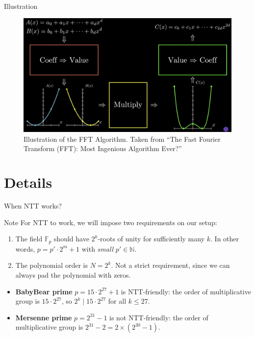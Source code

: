 \documentclass{zkdl-presentation-template}
\begin{document}
    \begin{frame}{Illustration}
        \begin{figure}
            \centering
            \includegraphics[width=\textwidth]{images/lecture_13/ntt_visualization.png}
            \caption{Illustration of the FFT Algorithm. Taken from ``The Fast Fourier Transform (FFT): Most Ingenious Algorithm Ever?''}
        \end{figure}
    \end{frame}

    \section{Details}

    \begin{frame}{When NTT works?}
        \begin{block}{Note}
            For NTT to work, we will impose two requirements on 
            our setup:
            \begin{enumerate}
                \item The field $\mathbb{F}_p$ should have $2^k$-roots of unity for sufficiently many $k$. In other words, $p=p' \cdot 2^m + 1$ with \emph{small} $p' \in \mathbb{N}$.\pause
                \item The polynomial order is $N=2^k$. Not a strict requirement, since we can always pad the polynomial with zeros.\pause
            \end{enumerate}
        \end{block}

        \begin{example}
            \begin{itemize}
                \item \textbf{BabyBear prime} $p=15 \cdot 2^{27} + 1$ is NTT-friendly: the order of multiplicative
                group is $15 \cdot 2^{27}$, so $2^k \mid 15 \cdot 2^{27}$ for all $k \leq 27$.\pause
                \item \textbf{Mersenne prime} $p=2^{31}-1$ is not NTT-friendly: the order of multiplicative 
                group is $2^{31}-2 = 2 \times (2^{30}-1)$.
            \end{itemize}
        \end{example}
    \end{frame}
\end{document}
